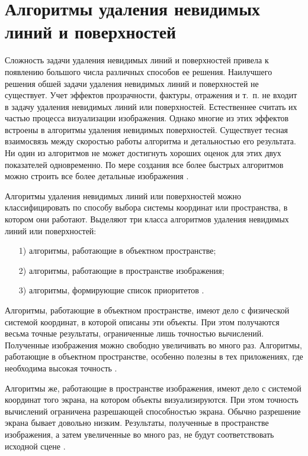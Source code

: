 \section{Алгоритмы удаления невидимых линий и поверхностей}
\label{sec:z_buffer}

Сложность задачи удаления невидимых линий и поверхностей привела к появлению большого числа различных способов ее решения. 
Наилучшего решения обшей задачи удаления невидимых линий и поверхностей не существует. 
Учет эффектов прозрачности, фактуры, отражения и т.~п. не входит в задачу удаления невидимых линий или поверхностей. 
Естественнее считать их частью процесса визуализации изображения. 
Однако многие из этих эффектов встроены в алгоритмы удаления невидимых поверхностей. 
Существует тесная взаимосвязь между скоростью работы алгоритма и детальностью его результата. 
Ни один из алгоритмов не может достигнуть хороших оценок для этих двух показателей одновременно. 
По мере создания все более быстрых алгоритмов можно строить все более детальные изображения \cite{Demin2005}.

Алгоритмы удаления невидимых линий или поверхностей можно классифицировать по способу выбора системы координат или пространства, в котором они работают. Выделяют три класса алгоритмов удаления невидимых линий или поверхностей:

\begin{enumerate}
\item[1)]
алгоритмы, работающие в объектном пространстве;
\item[2)]
алгоритмы, работающие в пространстве изображения;
\item[3)]
алгоритмы, формирующие список приоритетов \cite{Demin2005}.
\end{enumerate}

Алгоритмы, работающие в объектном пространстве, имеют дело с физической системой координат, в которой описаны эти объекты. 
При этом получаются весьма точные результаты, ограниченные лишь точностью вычислений. 
Полученные изображения можно свободно увеличивать во много раз. 
Алгоритмы, работающие в объектном пространстве, особенно полезны в тех приложениях, где необходима высокая точность \cite{Demin2005}.

Алгоритмы же, работающие в пространстве изображения, имеют дело с системой координат того экрана, на котором объекты визуализируются. 
При этом точность вычислений ограничена разрешающей способностью экрана. Обычно разрешение экрана бывает довольно низким. 
Результаты, полученные в пространстве изображения, а затем увеличенные во много раз, не будут соответствовать исходной сцене \cite{Demin2005}.

